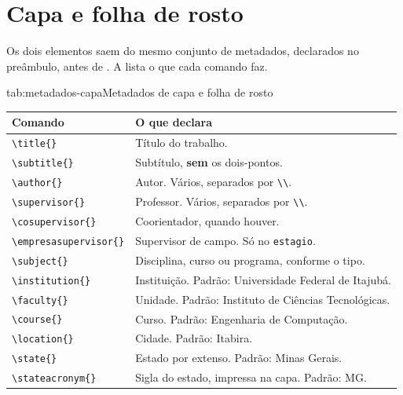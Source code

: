 \section{Capa e folha de rosto}\label{sec:capa-folha-rosto}

Os dois elementos saem do mesmo conjunto de metadados, declarados no preâmbulo, antes de
\verb||. A  lista o que cada comando faz.

\begin{tabelaabnt}{tab:metadados-capa}{Metadados de capa e folha de rosto}
    \begin{tabular}{@{}lp{}@{}}
        \toprule
        \textbf{Comando} & \textbf{O que declara} \\
        \midrule
        \texttt{\textbackslash title\{\}}             & Título do trabalho.                                     \\
        \texttt{\textbackslash subtitle\{\}}          & Subtítulo, \textbf{sem} os dois-pontos.                 \\
        \texttt{\textbackslash author\{\}}            & Autor. Vários, separados por \texttt{\textbackslash\textbackslash}.                 \\
        \texttt{\textbackslash supervisor\{\}}        & Professor. Vários, separados por \texttt{\textbackslash\textbackslash}.             \\
        \texttt{\textbackslash cosupervisor\{\}}      & Coorientador, quando houver.                            \\
        \texttt{\textbackslash empresasupervisor\{\}} & Supervisor de campo. Só no \texttt{estagio}.            \\
        \texttt{\textbackslash subject\{\}}           & Disciplina, curso ou programa, conforme o tipo.         \\
        \texttt{\textbackslash institution\{\}}       & Instituição. Padrão: Universidade Federal de Itajubá.   \\
        \texttt{\textbackslash faculty\{\}}           & Unidade. Padrão: Instituto de Ciências Tecnológicas.    \\
        \texttt{\textbackslash course\{\}}            & Curso. Padrão: Engenharia de Computação.                \\
        \texttt{\textbackslash location\{\}}          & Cidade. Padrão: Itabira.                                \\
        \texttt{\textbackslash state\{\}}             & Estado por extenso. Padrão: Minas Gerais.               \\
        \texttt{\textbackslash stateacronym\{\}}      & Sigla do estado, impressa na capa. Padrão: MG.          \\
        \bottomrule
    \end{tabular}
\end{tabelaabnt}

